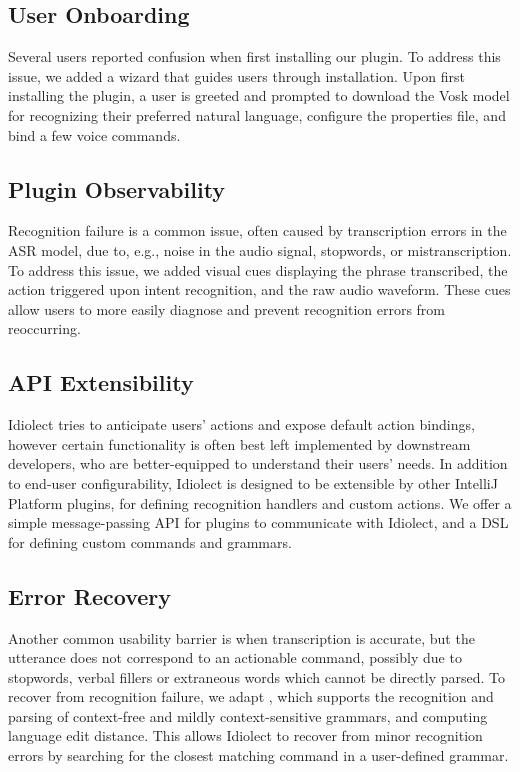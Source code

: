 \documentclass{article}
\theoremstyle{plain}
\theoremstyle{definition}
\theoremstyle{remark}
\begin{document}
\subsection{User Onboarding}

Several users reported confusion when first installing our plugin. To address this issue, we added a wizard that guides users through installation. Upon first installing the plugin, a user is greeted and prompted to download the Vosk model for recognizing their preferred natural language, configure the properties file, and bind a few voice commands.

\subsection{Plugin Observability}

Recognition failure is a common issue, often caused by transcription errors in the ASR model, due to, e.g., noise in the audio signal, stopwords, or mistranscription. To address this issue, we added visual cues displaying the phrase transcribed, the action triggered upon intent recognition, and the raw audio waveform. These cues allow users to more easily diagnose and prevent recognition errors from reoccurring.

\subsection{API Extensibility}

Idiolect tries to anticipate users' actions and expose default action bindings, however certain functionality is often best left implemented by downstream developers, who are better-equipped to understand their users' needs. In addition to end-user configurability, Idiolect is designed to be extensible by other IntelliJ Platform plugins, for defining recognition handlers and custom actions. We offer a simple message-passing API for plugins to communicate with Idiolect, and a DSL for defining custom commands and grammars.

\subsection{Error Recovery}\label{sec:error}

Another common usability barrier is when transcription is accurate, but the utterance does not correspond to an actionable command, possibly due to stopwords, verbal fillers or extraneous words which cannot be directly parsed. To recover from recognition failure, we adapt \citet{considine2022tidyparse}, which supports the recognition and parsing of context-free and mildly context-sensitive grammars, and computing language edit distance. This allows Idiolect to recover from minor recognition errors by searching for the closest matching command in a user-defined grammar.
\end{document}

